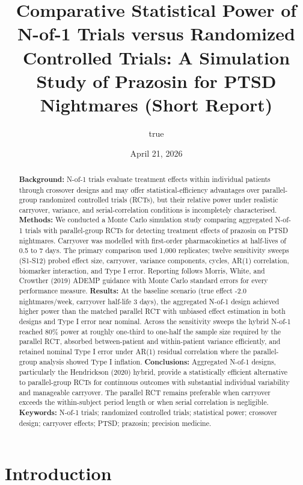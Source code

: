 \documentclass[
  11pt,
]{article}
\title{Comparative Statistical Power of N-of-1 Trials versus Randomized
Controlled Trials: A Simulation Study of Prazosin for PTSD Nightmares
(Short Report)}
\author{true}
\date{April 21, 2026}
\begin{document}
\maketitle
\begin{abstract}
\textbf{Background:} N-of-1 trials evaluate treatment effects within
individual patients through crossover designs and may offer
statistical-efficiency advantages over parallel-group randomized
controlled trials (RCTs), but their relative power under realistic
carryover, variance, and serial-correlation conditions is incompletely
characterised. \textbf{Methods:} We conducted a Monte Carlo simulation
study comparing aggregated N-of-1 trials with parallel-group RCTs for
detecting treatment effects of prazosin on PTSD nightmares. Carryover
was modelled with first-order pharmacokinetics at half-lives of 0.5 to 7
days. The primary comparison used 1,000 replicates; twelve sensitivity
sweeps (S1-S12) probed effect size, carryover, variance components,
cycles, AR(1) correlation, biomarker interaction, and Type I error.
Reporting follows Morris, White, and Crowther (2019) ADEMP guidance with
Monte Carlo standard errors for every performance measure.
\textbf{Results:} At the baseline scenario (true effect -2.0
nightmares/week, carryover half-life 3 days), the aggregated N-of-1
design achieved higher power than the matched parallel RCT with unbiased
effect estimation in both designs and Type I error near nominal. Across
the sensitivity sweeps the hybrid N-of-1 reached 80\% power at roughly
one-third to one-half the sample size required by the parallel RCT,
absorbed between-patient and within-patient variance efficiently, and
retained nominal Type I error under AR(1) residual correlation where the
parallel-group analysis showed Type I inflation. \textbf{Conclusions:}
Aggregated N-of-1 designs, particularly the Hendrickson (2020) hybrid,
provide a statistically efficient alternative to parallel-group RCTs for
continuous outcomes with substantial individual variability and
manageable carryover. The parallel RCT remains preferable when carryover
exceeds the within-subject period length or when serial correlation is
negligible. \textbf{Keywords:} N-of-1 trials; randomized controlled
trials; statistical power; crossover design; carryover effects; PTSD;
prazosin; precision medicine.
\end{abstract}

\section{Introduction}\label{introduction}
\end{document}
